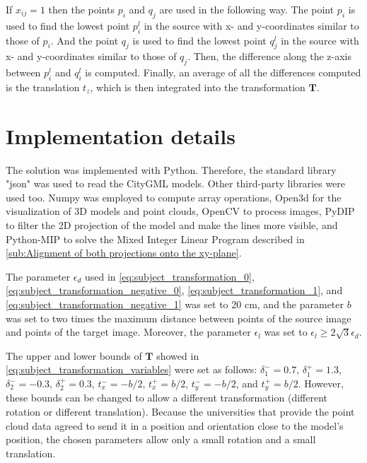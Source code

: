             If $x_{ij} = 1$ then the points $p_i$ and $q_j$ are used in the following way.
            The point $p_i$ is used to find the lowest point $p_i^l$ in the source with x- and y-coordinates similar to those of $p_i$.
            And the point $q_j$ is used to find the lowest point $q_j^l$ in the source with x- and y-coordinates similar to those of $q_j$.
            Then, the difference along the z-axis between $p_i^l$ and $q_i^l$ is computed.
            Finally, an average of all the differences computed is the translation $t_z$, which is then integrated into the transformation $\pmb{T}$.

    \section{Implementation details}
        The solution was implemented with Python. Therefore, the standard library "json" was used to read the CityGML models.
        Other third-party libraries were used too. Numpy \cite{harris_2020_numpy} was employed to compute array operations, 
        Open3d \cite{Zhou_2018_open3d} for the visualization of 3D models and point clouds, 
        OpenCV \cite{opencv_library} to process images, PyDIP to filter the 2D projection of the model and make the lines more visible, 
        and Python-MIP \cite{pythonMIP_library} to solve the Mixed Integer Linear Program described in \autoref{sub:Alignment of both projections onto the xy-plane}.
        
        The parameter $\epsilon_d$ used in \autoref{eq:subject_transformation_0}, \autoref{eq:subject_transformation_negative_0}, \autoref{eq:subject_transformation_1}, and \autoref{eq:subject_transformation_negative_1}
        was set to 20 cm, and the parameter $b$ was set to two times the maximum distance between points of the source image and points of the target image.
        Moreover, the parameter $\epsilon_l$ was set to $\epsilon_l \geq 2 \sqrt{3} \epsilon_d$. 
        
        The upper and lower bounds of $\pmb{T}$ showed in \autoref{eq:subject_transformation_variables} were set as follows: 
        $\delta_1^- = 0.7$, $\delta_1^+ = 1.3$, $\delta_2^- = -0.3$, $\delta_2^+ = 0.3$, $t_x^- = -b / 2$, $t_x^+ = b / 2$, $t_y^- = -b / 2$, and $t_y^+ = b / 2$.
        However, these bounds can be changed to allow a different transformation (different rotation or different translation).
        Because the universities that provide the point cloud data agreed to send it in a position and orientation close to the model’s position, 
        the chosen parameters allow only a small rotation and a small translation.


